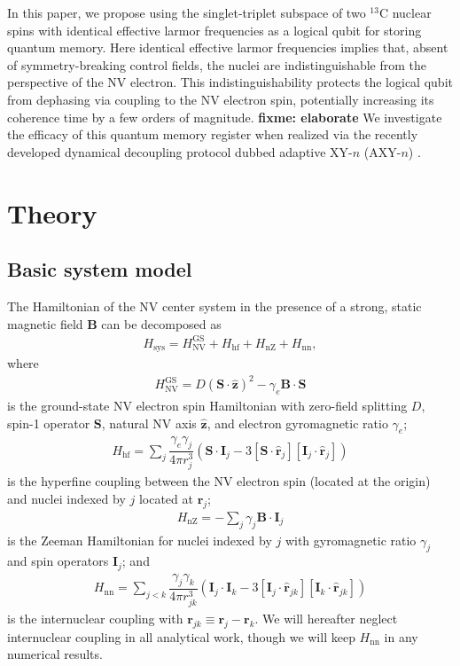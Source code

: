 \documentclass[twocolumn]{revtex4}
\renewcommand{\t}{\text} %
\newcommand{\f}[2]{\dfrac{#1}{#2}} %
\newcommand{\p}[1]{\left(#1\right)} %
\renewcommand{\sp}[1]{\left[#1\right]} %
\renewcommand{\v}{\bm} %
\newcommand{\uv}[1]{\hat{\v{#1}}} %
\renewcommand{\c}{\cdot} %
\newcommand{\NV}{\t{NV}}
\newcommand{\fixme}[1]{{\bf \color{red} fixme: #1}}
\begin{document}
In this paper, we propose using the singlet-triplet subspace of two
$^{13}$C nuclear spins with identical effective larmor frequencies as
a logical qubit for storing quantum memory. Here identical effective
larmor frequencies implies that, absent of symmetry-breaking control
fields, the nuclei are indistinguishable from the perspective of the
NV electron. This indistinguishability protects the logical qubit from
dephasing via coupling to the NV electron spin, potentially increasing
its coherence time by a few orders of magnitude. \fixme{elaborate} We
investigate the efficacy of this quantum memory register when realized
via the recently developed dynamical decoupling protocol dubbed
adaptive XY-$n$ (AXY-$n$) \cite{casanova2015robust}.

\section{Theory}

\subsection{Basic system model}

The Hamiltonian of the NV center system in the presence of a strong,
static magnetic field $\v B$ can be decomposed as
\begin{align}
  H_\t{sys} = H_\NV^\t{GS} + H_\t{hf} + H_\t{nZ}  + H_\t{nn},
\end{align}
where
\begin{align}
  H_\NV^\t{GS} = D\p{\v S\c\uv z}^2 - \gamma_e\v B\c\v S
\end{align}
is the ground-state NV electron spin Hamiltonian with zero-field
splitting $D$, spin-1 operator $\v S$, natural NV axis $\uv z$, and
electron gyromagnetic ratio $\gamma_e$;
\begin{align}
  H_\t{hf} = \sum_j\f{\gamma_e\gamma_j}{4\pi r_j^3}
  \p{\v S\c\v I_j-3\sp{\v S\c\uv r_j}\sp{\v I_j\c\uv r_j}}
\end{align}
is the hyperfine coupling between the NV electron spin (located at the
origin) and nuclei indexed by $j$ located at $\v r_j$;
\begin{align}
  H_\t{nZ} = -\sum_j\gamma_j\v B\c\v I_j
\end{align}
is the Zeeman Hamiltonian for nuclei indexed by $j$ with gyromagnetic
ratio $\gamma_j$ and spin operators $\v I_j$; and
\begin{align}
  H_\t{nn} = \sum_{j<k}\f{\gamma_j\gamma_k}{4\pi r_{jk}^3}
  \p{\v I_j\c\v I_k-3\sp{\v I_j\c\uv r_{jk}}\sp{\v I_k\c\uv r_{jk}}}
\end{align}
is the internuclear coupling with $\v r_{jk}\equiv\v r_j-\v r_k$. We
will hereafter neglect internuclear coupling in all analytical work,
though we will keep $H_\t{nn}$ in any numerical results.
\end{document}

